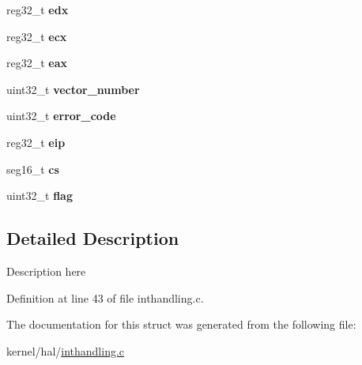 \begin{DoxyCompactItemize}
\mbox{\label{structitrpt__reg__state_afbed8707dfee80954873d16f1f9ba740}} 
reg32\+\_\+t {\bfseries edx}
\item 
\mbox{\label{structitrpt__reg__state_a5cc36564ffb117638da36efef4c0775e}} 
reg32\+\_\+t {\bfseries ecx}
\item 
\mbox{\label{structitrpt__reg__state_adfa60b78d5023e80a43dd0555f086316}} 
reg32\+\_\+t {\bfseries eax}
\item 
\mbox{\label{structitrpt__reg__state_a59eecdf6175012895958f933784adec2}} 
uint32\+\_\+t {\bfseries vector\+\_\+number}
\item 
\mbox{\label{structitrpt__reg__state_ad3baf912bbfff2b66abffd3e69d3cc75}} 
uint32\+\_\+t {\bfseries error\+\_\+code}
\item 
\mbox{\label{structitrpt__reg__state_a47e4b9ade962170042f2e40d6562f7f8}} 
reg32\+\_\+t {\bfseries eip}
\item 
\mbox{\label{structitrpt__reg__state_a91d538e795f5d3828ef8d7e276cdf4b0}} 
seg16\+\_\+t {\bfseries cs}
\item 
\mbox{\label{structitrpt__reg__state_a69b857a6d59c84bc4d8e838fae568e5d}} 
uint32\+\_\+t {\bfseries flag}
\end{DoxyCompactItemize}


\subsection{Detailed Description}
Description here 

Definition at line 43 of file inthandling.\+c.



The documentation for this struct was generated from the following file\+:\begin{DoxyCompactItemize}
\item 
kernel/hal/\hyperlink{inthandling_8c}{inthandling.\+c}\end{DoxyCompactItemize}
